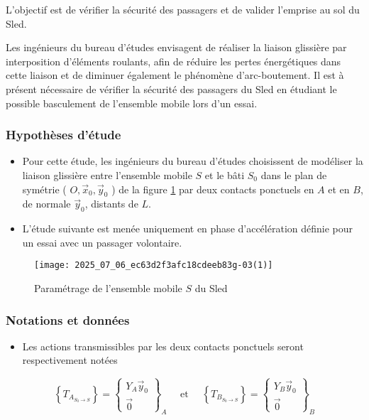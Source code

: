 \begin{obj}
L'objectif est de vérifier la sécurité des passagers et de valider l'emprise au sol du Sled.

Les ingénieurs du bureau d'études envisagent de réaliser la liaison glissière par interposition d'éléments roulants, afin de réduire les pertes énergétiques dans cette liaison et de diminuer également le phénomène d'arc-boutement. Il est à présent nécessaire de vérifier la sécurité des passagers du Sled en étudiant le possible basculement de l'ensemble mobile lors d'un essai.
\end{obj}

\ifprof
\else
\subsubsection*{Hypothèses d'étude}
\begin{itemize}
  \item Pour cette étude, les ingénieurs du bureau d'études choisissent de modéliser la liaison glissière entre l'ensemble mobile $S$ et le bâti $S_{0}$ dans le plan de symétrie ( $O, \vec{x}_{0}, \vec{y}_{0}$ ) de la figure \ref{ccs_mp_2022_fig_05} par deux contacts ponctuels en $A$ et en $B$, de normale $\vec{y}_{0}$, distants de $L$.
  \item L'étude suivante est menée uniquement en phase d'accélération définie pour un essai avec un passager volontaire.
\end{itemize}

\begin{figure}[!h]
\centering
\texttt{[image: 2025\_07\_06\_ec63d2f3afc18cdeeb83g-03(1)]}
\caption{\label{ccs_mp_2022_fig_05}Paramétrage de l'ensemble mobile $S$ du Sled}
\end{figure}



\subsubsection*{Notations et données}
\begin{itemize}
  \item Les actions transmissibles par les deux contacts ponctuels seront respectivement notées
\end{itemize}

$$
\left\{T_{A_{S_{0} \rightarrow S}}\right\}=\left\{\begin{array}{c}
Y_{A} \vec{y}_{0} \\
\overrightarrow{0}
\end{array}\right\}_{A} \quad \text { et } \quad\left\{T_{B_{S_{0} \rightarrow S}}\right\}=\left\{\begin{array}{c}
Y_{B} \vec{y}_{0} \\
\overrightarrow{0}
\end{array}\right\}_{B}
$$

